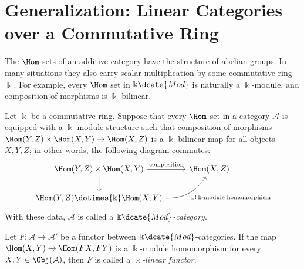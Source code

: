 
\section{Generalization: Linear Categories over a Commutative Ring}\label{sec:linear-cat}
\hypertarget{o014.aljabr2.chapter1.linear-categories-over-commutative-rings}{ }

The $\Hom$ sets of an additive category have the structure of abelian groups.
In many situations they also carry scalar multiplication by some commutative
ring $\Bbbk$. For example, every $\Hom$ set in $\Bbbk\dcate{Mod}$ is naturally
a $\Bbbk$-module, and composition of morphisms is $\Bbbk$-bilinear.

\begin{definition}\label{def:cat-k-linear}
	Let $\Bbbk$ be a commutative ring. Suppose that every $\Hom$ set in a
	category $\mathcal{A}$ is equipped with a $\Bbbk$-module structure such that
	composition of morphisms
	$\Hom(Y, Z) \times \Hom(X, Y) \to \Hom(X, Z)$ is a $\Bbbk$-bilinear map
	for all objects $X,Y,Z$; in other words, the following diagram commutes:
	\[\begin{tikzcd}
		\Hom(Y, Z) \times \Hom(X, Y) \arrow[d] \arrow[r, "\text{composition}"] & \Hom(X, Z) \\
		\Hom(Y, Z) \dotimes{\Bbbk} \Hom(X, Y) \arrow[ru, bend right, start anchor=east, "{\exists! \; \text{$\Bbbk$-module homomorphism}}"']
	\end{tikzcd}  \]
	With these data, $\mathcal{A}$ is called a \emph{$\Bbbk\dcate{Mod}$-category}.

	Let $F: \mathcal{A} \to \mathcal{A}'$ be a functor between
	$\Bbbk\dcate{Mod}$-categories. If the map
	$\Hom(X,Y) \to \Hom(FX,FY)$ is a $\Bbbk$-module homomorphism for every
	$X,Y \in \Obj(\mathcal{A})$, then $F$ is called a
	\emph{$\Bbbk$-linear functor}.
\end{definition}

